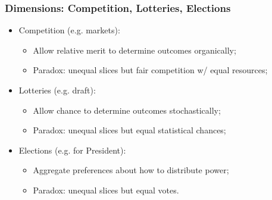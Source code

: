 \documentclass[aspectratio=169]{beamer}
\theoremstyle{principle}
\begin{document}
\begin{frame}
\frametitle{Dimensions: Competition, Lotteries, Elections}

\begin{itemize}
\item Competition (e.g. markets):
\begin{itemize}
\item Allow relative merit to determine outcomes organically;
\item Paradox: unequal slices but fair competition w/ equal resources;
\end{itemize}
\bigskip
\bigskip
\item Lotteries (e.g. draft):
\begin{itemize}
\item Allow chance to determine outcomes stochastically;
\item Paradox: unequal slices but equal statistical chances;
\end{itemize}
\bigskip
\bigskip
\item Elections (e.g. for President):
\begin{itemize}
\item Aggregate preferences about how to distribute power;
\item Paradox: unequal slices but equal votes.
\end{itemize}
\end{itemize}

\end{frame}
\end{document}
